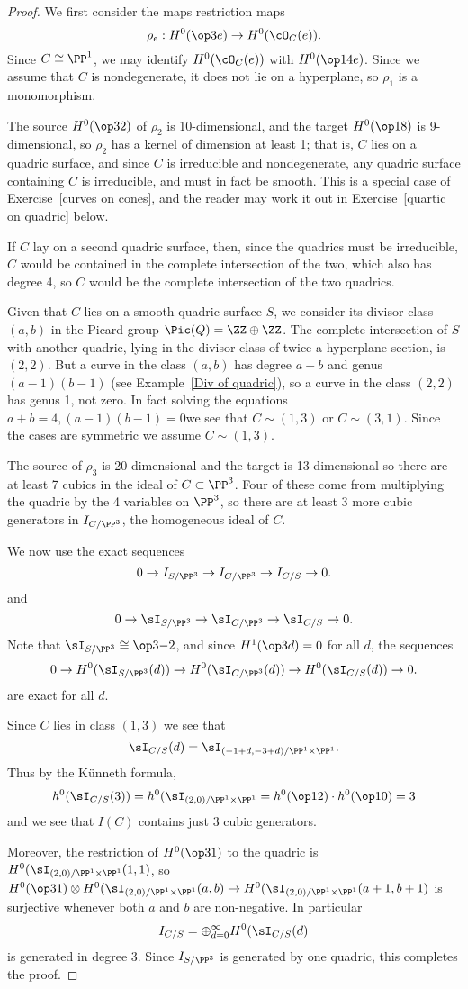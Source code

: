 \begin{proof}
We first consider the maps restriction maps
$$
\rho_e: H^0(\op3e) \to H^0(\cO_C(e)).
$$
Since $C\cong \PP^1$,
we may identify $H^0(\cO_C(e))$ with $H^0(\op1{4e})$.
 Since we assume that $C$ is nondegenerate, it does not lie on a hyperplane,
 so  $\rho_1$ is a monomorphism. 
 
The source $H^0(\op32)$ of $\rho_2$ is 10-dimensional, and the target $H^0(\op18)$ is
9-dimensional, so $\rho_2$ has a kernel of dimension at least 1; that is, $C$ lies on
a quadric surface, and since $C$ is irreducible and nondegenerate, any quadric surface containing
$C$ is irreducible, and must in fact be smooth. This is a special case of 
Exercise~\ref{curves on cones}, and the reader may work it out in Exercise~\ref{quartic on quadric} below.

If $C$ lay on a second quadric surface, then, since the quadrics must be irreducible,
$C$ would be contained in the complete intersection of the two, which also has degree 4, so 
$C$ would be the complete intersection of the two quadrics.

Given that $C$ lies on a smooth quadric surface $S$, we consider its divisor class $(a,b)$ in the 
Picard group $\Pic(Q) = \ZZ\oplus \ZZ$. The complete intersection of $S$ with another
quadric, lying in the divisor class of twice a hyperplane section, is $(2,2)$. But a curve
in the class $(a,b)$ has degree $a+b$ and genus $(a-1)(b-1)$ (see Example~\ref{Div of quadric}), so a curve in the class $(2,2)$
has genus 1, not zero. In fact solving the equations $a+b=4, (a-1)(b-1)=0$we see that $C\sim (1,3)$ or $C\sim (3,1)$. Since the cases
are symmetric we assume $C\sim(1,3)$. 

The source of $\rho_3$ is 20 dimensional and the target is 13 dimensional so there are at least 7
cubics in the ideal of $C\subset \PP^3$. Four of these come from multiplying the quadric
by the 4 variables on $\PP^3$, so there are at least 3 more cubic generators in $I_{C/\PP^3}$,
 the homogeneous ideal of $C$. 

We now use the exact sequences 
$$
0\to I_{S/\PP^3} \to I_{C/\PP^3} \to I_{C/S} \to 0.
$$
and
$$
0\to \sI_{S/\PP^3} \to \sI_{C/\PP^3} \to \sI_{C/S} \to 0.
$$
Note that $\sI_{S/\PP^3} \cong \op3{-2}$, and since $H^1(\op3d)=0$ for all $d$, 
the sequences
$$
0\to H^0(\sI_{S/\PP^3}(d)) \to H^0(\sI_{C/\PP^3}(d)) \to H^0(\sI_{C/S}(d)) \to 0.
$$
are exact for all $d$. 

Since $C$ lies in class $(1,3)$ we see that 
$$
\sI_{C/S}(d) = \sI_{(-1+d,-3+d)/\PP^1\times \PP^1}.
$$
Thus by the K\"unneth formula,
$$
h^0(\sI_{C/S}(3)) = h^0(\sI_{(2,0)/\PP^1\times \PP^1} = h^0(\op12)\cdot h^0(\op10) = 3
$$
and we see that $I(C)$ contains just 3 cubic generators. 

Moreover, the restriction
of $H^0(\op31)$ to the quadric is $H^0(\sI_{(2,0)/\PP^1\times \PP^1}(1,1)$,
so $H^0(\op31) \otimes H^0(\sI_{(2,0)/\PP^1\times \PP^1}(a,b) \to 
H^0(\sI_{(2,0)/\PP^1\times \PP^1}(a+1, b+1)$
is surjective whenever both $a$ and $b$ are non-negative. In particular
$$
I_{C/S} = \oplus_{d=0}^\infty H^0(\sI_{C/S}(d)
$$
 is generated in degree 3. Since $I_{S/\PP^3}$ is generated by one quadric, this
  completes the proof.
\end{proof}

